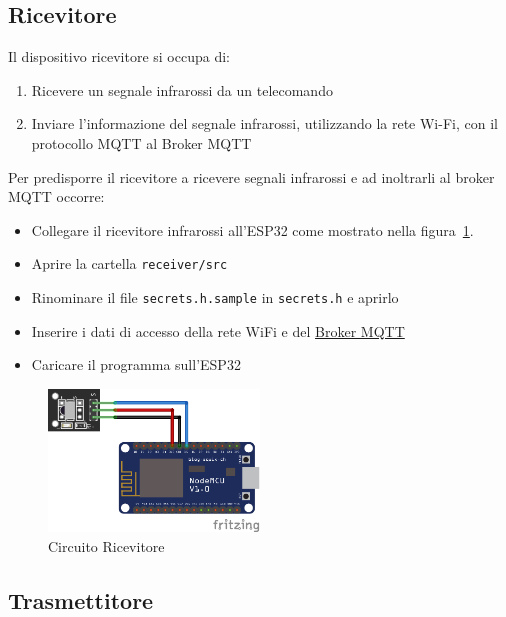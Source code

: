 \documentclass[a4paper,11pt]{article}
\begin{document}
    \subsection{Ricevitore}
    \label{subsec:receiver}

    Il dispositivo ricevitore si occupa di:

    \begin{enumerate}
        \item Ricevere un segnale infrarossi da un telecomando
        \item Inviare l'informazione del segnale infrarossi, utilizzando la rete Wi-Fi, con il protocollo MQTT al Broker MQTT
    \end{enumerate}

    Per predisporre il ricevitore a ricevere segnali infrarossi e ad inoltrarli al broker MQTT occorre:
    \begin{itemize}
        \item Collegare il ricevitore infrarossi all'ESP32 come mostrato nella figura~\ref{fig:circuito_ricevitore}.
        \item Aprire la cartella \texttt{receiver/src}
        \item Rinominare il file \texttt{secrets.h.sample} in \texttt{secrets.h} e aprirlo
        \item Inserire i dati di accesso della rete WiFi e del \hyperref[subsec:Broker]{Broker MQTT}
        \item Caricare il programma sull'ESP32
    \end{itemize}

    \begin{figure}[H]
      \centering
      \includegraphics[width=0.5\textwidth,height=\textheight,keepaspectratio]{assets/receiver_fritzing}
      \caption{Circuito Ricevitore}
      \label{fig:circuito_ricevitore}
    \end{figure}


    \subsection{Trasmettitore}
    \label{subsec:transmitter}
\end{document}
